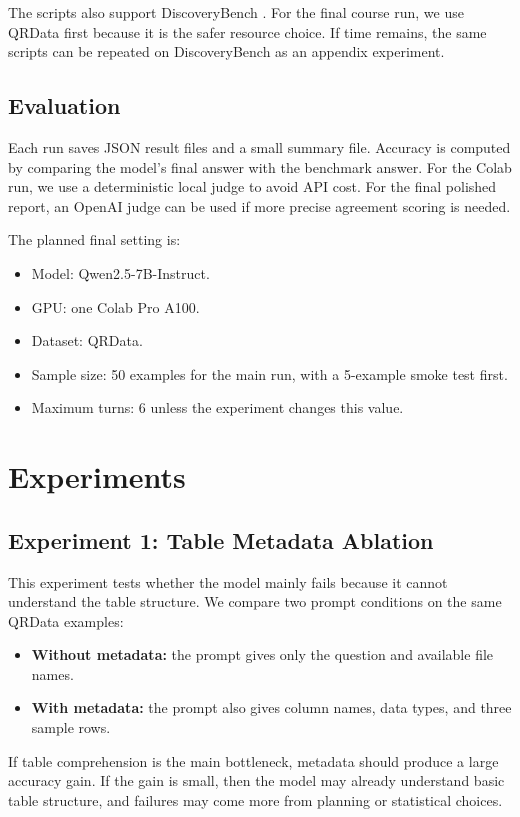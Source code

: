 \documentclass[11pt]{article}
\begin{document}
The scripts also support DiscoveryBench \citep{majumder2024discoverybench}.
For the final course run, we use QRData first because it is the safer resource choice.
If time remains, the same scripts can be repeated on DiscoveryBench as an appendix experiment.

\subsection{Evaluation}

Each run saves JSON result files and a small summary file.
Accuracy is computed by comparing the model's final answer with the benchmark answer.
For the Colab run, we use a deterministic local judge to avoid API cost.
For the final polished report, an OpenAI judge can be used if more precise agreement scoring is needed.

The planned final setting is:
\begin{itemize}
    \item Model: Qwen2.5-7B-Instruct.
    \item GPU: one Colab Pro A100.
    \item Dataset: QRData.
    \item Sample size: 50 examples for the main run, with a 5-example smoke test first.
    \item Maximum turns: 6 unless the experiment changes this value.
\end{itemize}

\section{Experiments}

\subsection{Experiment 1: Table Metadata Ablation}

This experiment tests whether the model mainly fails because it cannot understand the table structure.
We compare two prompt conditions on the same QRData examples:
\begin{itemize}
    \item \textbf{Without metadata:} the prompt gives only the question and available file names.
    \item \textbf{With metadata:} the prompt also gives column names, data types, and three sample rows.
\end{itemize}

If table comprehension is the main bottleneck, metadata should produce a large accuracy gain.
If the gain is small, then the model may already understand basic table structure, and failures may come more from planning or statistical choices.
\end{document}
